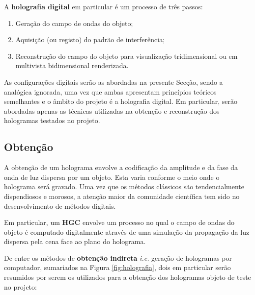 A \textbf{holografia digital} em particular é um processo de três passos\cite{Image2018}:
\begin{enumerate}
  \item Geração do campo de ondas do objeto;
  \item Aquisição (ou registo) do padrão de interferência;
  \item Reconstrução do campo do objeto para visualização tridimensional ou em multivista bidimensional renderizada.
\end{enumerate}

As configurações digitais serão as abordadas na presente Secção, sendo a analógica ignorada, uma vez que ambas apresentam princípios teóricos semelhantes e o âmbito do projeto é a holografia digital. Em particular, serão abordadas apenas as técnicas utilizadas na obtenção e reconstrução dos hologramas testados no projeto.


\subsection{Obtenção}
\label{ssec::estado-arte:holograma:obter}

A obtenção de um holograma envolve a codificação da amplitude e da fase da onda de luz dispersa por um objeto. Esta varia conforme o meio onde o holograma será gravado. Uma vez que os métodos clássicos são tendencialmente dispendiosos e morosos, a atenção maior da comunidade científica tem sido no desenvolvimento de métodos digitais\cite{Image2018}.

Em particular, um \textbf{\ac{HGC}} envolve um processo no qual o campo de ondas do objeto é computado digitalmente através de uma simulação da propagação da luz dispersa pela cena face ao plano do holograma.

De entre os métodos de \textbf{obtenção indireta} {\textit{i.e.} geração de hologramas por computador}, sumariados na Figura \ref{fig:holografia}, dois em particular serão resumidos por serem os utilizados para a obtenção dos hologramas objeto de teste no projeto\cite{holorepo2018,Gilles2016}:

